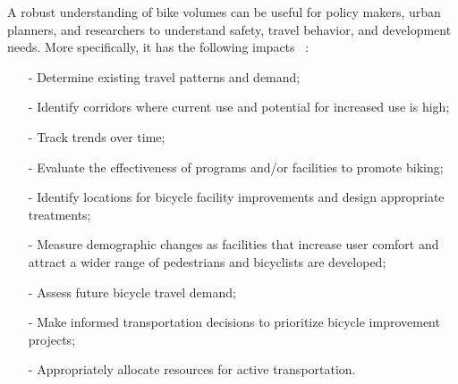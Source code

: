 \documentclass [11pt, proquest] {uwthesis}[2015/03/03]
\begin{document}
A robust understanding of bike volumes can be useful for policy makers, urban planners, and researchers to understand safety, travel behavior, and development needs. More specifically, it has the following impacts~\cite{LAManual} :
\begin{enumerate}
\item[-] Determine existing travel patterns and demand;
\item[-] Identify corridors where current use and potential for increased use is high;
\item[-] Track trends over time;
\item[-] Evaluate the effectiveness of programs and/or facilities to promote biking;
\item[-] Identify locations for bicycle facility improvements and design appropriate treatments;
\item[-] Measure demographic changes as facilities that increase user comfort and attract a wider range of pedestrians and bicyclists are developed;
\item[-] Assess future bicycle travel demand;
\item[-] Make informed transportation decisions to prioritize bicycle improvement projects;
\item[-] Appropriately allocate resources for active transportation.
\end{enumerate}
\end{document}
